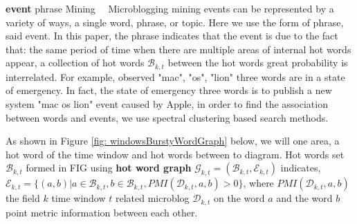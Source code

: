 \documentclass[conference,compsoc]{IEEEtran}
\begin{document}

\textbf{event} phrase Mining
\ \ Microblogging mining events can be represented by a variety of ways, a single word, phrase, or topic.
Here we use the form of phrase, said event.
In this paper, the phrase indicates that the event is due to the fact that: the same period of time when there are multiple areas of internal hot words appear, a collection of hot words \(\mathcal{B}_{k, t} \) between the hot words great probability is interrelated. For example, observed "mac", "os", "lion" three words are in a state of emergency.
In fact, the state of emergency three words is to publish a new system "mac os lion" event caused by Apple, in order to find the association between words and events, we use spectral clustering based search methods.

As shown in Figure \ref{fig: windowsBurstyWordGraph} below, we will one area, a hot word of the time window and hot words between to diagram.
Hot words set \(\mathcal{B}_{k, t} \) formed in FIG using \textbf{hot word graph} \(\mathcal{G}_{k, t} = (\mathcal{B}_{k, t}, \mathcal{E}_{k, t}) \) indicates,
\(\mathcal{E}_{k, t} = \{(a, b) | a \in \mathcal{B}_{k, t}, b \in \mathcal{B}_{k, t }, PMI (\mathcal{D}_{k, t}, a, b)> 0 \} \), where \(PMI (\mathcal{D}_{k, t}, a, b) \) the field \(k \) time window \(t \) related microblog \(\mathcal{D}_{k, t} \) on the word \(a\) and the word \(b\) point metric information between each other.
\end{document}
